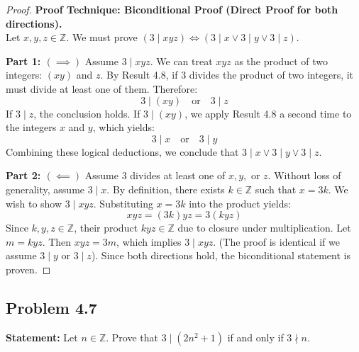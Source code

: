 \documentclass[11pt]{article}
\theoremstyle{definition}
\theoremstyle{remark}
\newcommand{\Z}{\mathbb{Z}}
\begin{document}
\begin{proof}
\textbf{Proof Technique: Biconditional Proof (Direct Proof for both directions).} \\
Let $x, y, z \in \Z$. We must prove $(3 \mid xyz) \iff (3 \mid x \lor 3 \mid y \lor 3 \mid z)$.

\textbf{Part 1: $(\implies)$} Assume $3 \mid xyz$. 
We can treat $xyz$ as the product of two integers: $(xy)$ and $z$. By Result 4.8, if $3$ divides the product of two integers, it must divide at least one of them. Therefore:
\[ 3 \mid (xy) \quad \text{or} \quad 3 \mid z \]
If $3 \mid z$, the conclusion holds. If $3 \mid (xy)$, we apply Result 4.8 a second time to the integers $x$ and $y$, which yields:
\[ 3 \mid x \quad \text{or} \quad 3 \mid y \]
Combining these logical deductions, we conclude that $3 \mid x \lor 3 \mid y \lor 3 \mid z$.

\textbf{Part 2: $(\impliedby)$} Assume $3$ divides at least one of $x, y,$ or $z$. 
Without loss of generality, assume $3 \mid x$. By definition, there exists $k \in \Z$ such that $x = 3k$. 
We wish to show $3 \mid xyz$. Substituting $x = 3k$ into the product yields:
\[ xyz = (3k)yz = 3(kyz) \]
Since $k, y, z \in \Z$, their product $kyz \in \Z$ due to closure under multiplication. Let $m = kyz$. Then $xyz = 3m$, which implies $3 \mid xyz$. (The proof is identical if we assume $3 \mid y$ or $3 \mid z$). 
Since both directions hold, the biconditional statement is proven.
\end{proof}

\subsection{Problem 4.7}
\textbf{Statement:} Let $n \in \Z$. Prove that $3 \mid (2n^2 + 1)$ if and only if $3 \nmid n$.
\end{document}
